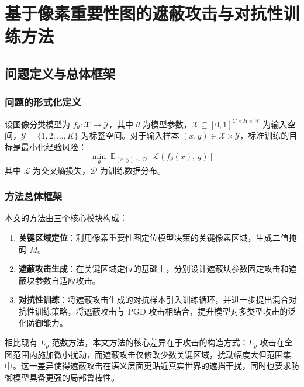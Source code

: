 
\chapter{基于像素重要性图的遮蔽攻击与对抗性训练方法} \label{chpt:pipeline}

\section{问题定义与总体框架}

\subsection{问题的形式化定义}

设图像分类模型为 $f_{\theta}: \mathcal{X} \rightarrow \mathcal{Y}$，其中 $\theta$ 为模型参数，$\mathcal{X} \subseteq [0,1]^{C \times H \times W}$ 为输入空间，$\mathcal{Y} = \{1, 2, \ldots, K\}$ 为标签空间。对于输入样本 $(x, y) \in \mathcal{X} \times \mathcal{Y}$，标准训练的目标是最小化经验风险：
\begin{equation}
  \min_{\theta} \; \mathbb{E}_{(x,y)\sim\mathcal{D}} \left[ \mathcal{L}\!\left(f_{\theta}(x),\, y\right) \right]
\end{equation}
其中 $\mathcal{L}$ 为交叉熵损失，$\mathcal{D}$ 为训练数据分布。

\subsection{方法总体框架}

本文的方法由三个核心模块构成：

\begin{enumerate}
  \item \textbf{关键区域定位}：利用像素重要性图定位模型决策的关键像素区域，生成二值掩码 $M$。
  \item \textbf{遮蔽攻击生成}：在关键区域定位的基础上，分别设计遮蔽块参数固定攻击和遮蔽块参数自适应攻击。
  \item \textbf{对抗性训练}：将遮蔽攻击生成的对抗样本引入训练循环，并进一步提出混合对抗性训练策略，将遮蔽攻击与 PGD 攻击\cite{madry2018pgd}相结合，提升模型对多类型攻击的泛化防御能力。
\end{enumerate}

相比现有 $L_p$ 范数方法，本文方法的核心差异在于攻击的构造方式：$L_p$ 攻击在全图范围内施加微小扰动，而遮蔽攻击仅修改少数关键区域，扰动幅度大但范围集中。这一差异使得遮蔽攻击在语义层面更贴近真实世界的遮挡干扰，同时也要求防御模型具备更强的局部鲁棒性。


